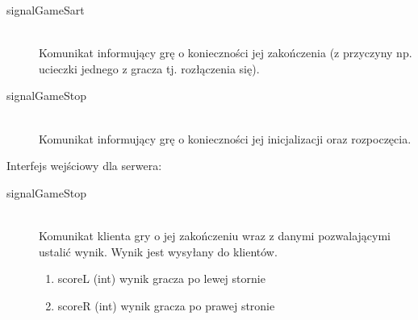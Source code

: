 \begin{description}
	\item[signalGameSart] \hfill \\
	Komunikat informujący grę o konieczności jej zakończenia (z przyczyny np. ucieczki jednego z gracza tj. rozłączenia się).
\end{description}

\begin{description}
	\item[signalGameStop] \hfill \\
	Komunikat informujący grę o konieczności jej inicjalizacji oraz rozpoczęcia.
\end{description}

Interfejs wejściowy dla serwera:

\begin{description}
	\item[signalGameStop] \hfill \\
	Komunikat klienta gry o jej zakończeniu wraz z danymi pozwalającymi ustalić wynik. Wynik jest wysyłany do klientów.
	\begin{enumerate}
		\item scoreL (int) wynik gracza po lewej stornie
		\item scoreR (int) wynik gracza po prawej stronie
	\end{enumerate}
\end{description}

